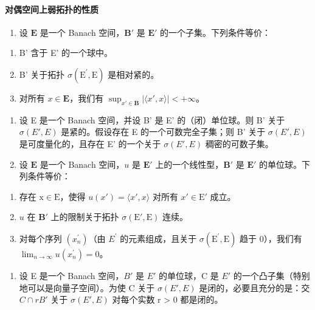 \paragraph{对偶空间上弱拓扑的性质}

\begin{enumerate}
\def\labelenumi{\arabic{enumi})}
\setcounter{enumi}{17}
\tightlist
\item
  设 \(\mathbf{E}\) 是一个 Banach 空间，\(\mathbf{B}'\) 是 \(\mathbf{E}'\) 的一个子集。下列条件等价：
\end{enumerate}

\begin{enumerate}
\def\labelenumi{(\roman{enumi})}
\item
  B' 含于 E' 的一个球中。
\item
  B' 关于拓扑 \(\sigma(\mathrm{E}^{\prime}, \mathrm{E})\) 是相对紧的。
\item
  对所有 \(x \in \mathbf{E}\)，我们有 \(\sup_{x' \in \mathbf{B}} |\langle x', x \rangle| < +\infty\)。
\end{enumerate}

\begin{enumerate}
\def\labelenumi{\arabic{enumi})}
\setcounter{enumi}{18}
\item
  设 E 是一个 Banach 空间，并设 B' 是 E' 的（闭）单位球。则 B' 关于 \(\sigma(E', E)\) 是紧的。假设存在 E 的一个可数完全子集；则 B' 关于 \(\sigma(E', E)\) 是可度量化的，且存在 E' 的一个关于 \(\sigma(E', E)\) 稠密的可数子集。
\item
  设 \(\mathbf{E}\) 是一个 Banach 空间，\(u\) 是 \(\mathbf{E}'\) 上的一个线性型，\(\mathbf{B}'\) 是 \(\mathbf{E}'\) 的单位球。下列条件等价：
\end{enumerate}

\begin{enumerate}
\def\labelenumi{(\roman{enumi})}
\item
  存在 \(\mathrm{x} \in \mathrm{E}\)，使得 \(u(x') = \langle x', x \rangle\) 对所有 \(x' \in \mathrm{E}'\) 成立。
\item
  \(u\) 在 \(\mathbf{B}'\) 上的限制关于拓扑 \(\sigma(\mathrm{E}', \mathrm{E})\) 连续。
\item
  对每个序列 \((x_{n}^{\prime})\)（由 \(E^{\prime}\) 的元素组成，且关于 \(\sigma(\mathrm{E}^{\prime}, \mathrm{E})\) 趋于 0），我们有 \(\lim_{n \to \infty} u(x_{n}^{\prime}) = 0\)。
\end{enumerate}

\begin{enumerate}
\def\labelenumi{\arabic{enumi})}
\setcounter{enumi}{20}
\tightlist
\item
  设 E 是一个 Banach 空间，\(B'\) 是 \(E'\) 的单位球，C 是 \(E'\) 的一个凸子集（特别地可以是向量子空间）。为使 C 关于 \(\sigma(E', E)\) 是闭的，必要且充分的是：交 \(C \cap rB'\) 关于 \(\sigma(E', E)\) 对每个实数 r \textgreater{} 0 都是闭的。
\end{enumerate}

